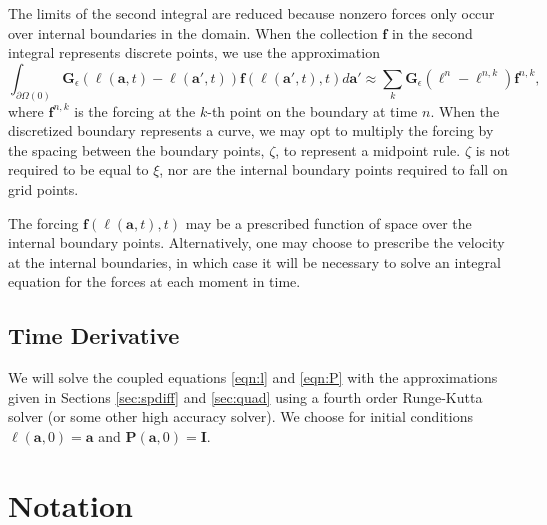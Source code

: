 \documentclass[12pt]{article}
\newcommand{\bees}[1]{\begin{equation*} #1 \end{equation*}}
\newcommand{\ba}{{\mathbf a}}
\newcommand{\bl}{{\pmb \ell}}
\newcommand{\ff}{{\mathbf f}}
\newcommand{\bG}{{\mathbf G}}
\newcommand{\bP}{{\mathbf P}}
\newcommand{\eps}{\epsilon}
\newcommand{\Ge}{\bG_\eps}
\begin{document}
	The limits of the second integral are reduced because nonzero forces only occur over internal boundaries in the domain. When the collection $\ff$ in the second integral represents discrete points, we use the approximation
	\bees{
	\int_{\partial\Omega(0)} \Ge(\bl(\ba,t) - \bl(\ba',t))\ff(\bl(\ba',t),t) d\ba' \approx \sum_k \Ge(\bl^n - \bl^{n,k})\ff^{n,k}, 
	}
	where $\ff^{n,k}$ is the forcing at the $k$-th point on the boundary at time $n$. When the discretized boundary represents a curve, we may opt to multiply the forcing by the spacing between the boundary points, $\zeta$, to represent a midpoint rule. $\zeta$ is not required to be equal to $\xi$, nor are the internal boundary points required to fall on grid points. 
	
	The forcing $\ff(\bl(\ba,t),t)$ may be a prescribed function of space over the internal boundary points. Alternatively, one may choose to prescribe the velocity at the internal boundaries, in which case it will be necessary to solve an integral equation for the forces at each moment in time.
	
	\subsection{Time Derivative}
	
	We will solve the coupled equations \eqref{eqn:l} and \eqref{eqn:P} with the approximations given in Sections \ref{sec:spdiff} and \ref{sec:quad} using a fourth order Runge-Kutta solver (or some other high accuracy solver). We choose for initial conditions $\bl(\ba,0) = \ba$ and $\bP(\ba,0) = \mathbf{I}$. 

	\pagebreak
	\appendix
	\section{Notation} 
	
\end{document}
